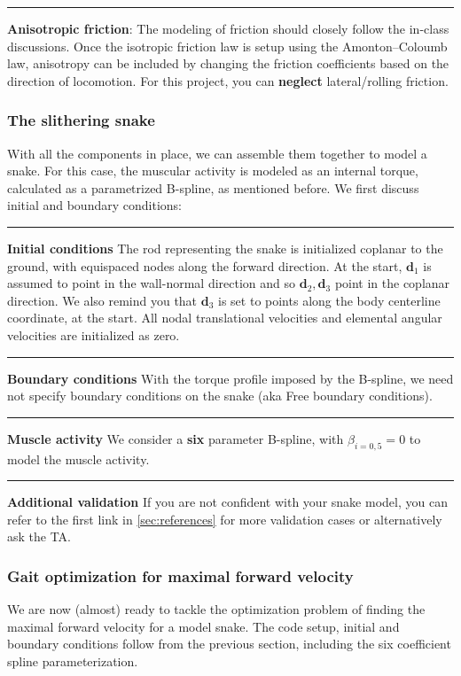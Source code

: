 \documentclass[11pt]{article}
\begin{document}
\noindent\rule{1\textwidth}{0.01pt}
\textbf{Anisotropic friction}: The modeling of friction should closely follow
the in-class discussions. Once the isotropic friction law is setup using
the Amonton--Coloumb law, anisotropy can be included by changing the
friction coefficients based on the direction of locomotion.
For this project, you can \textbf{neglect} lateral/rolling friction.

\subsubsection{The slithering snake}
\label{sec:org1e23fa4}
With all the components in place, we can assemble them together to model a
snake. For this case, the muscular activity
is modeled as an internal torque, calculated as a parametrized B-spline, as mentioned
before. We first discuss initial and boundary conditions:

\noindent\rule{1\textwidth}{0.01pt}
\textbf{Initial conditions} The rod representing the snake is initialized coplanar
to the ground, with equispaced nodes along the forward direction. At the start, \(\mathbf{d}_1\) is assumed
to point in the wall-normal direction and so \(\mathbf{d}_2, \mathbf{d}_3\) point in the coplanar direction. We also remind you that \(\mathbf{d}_3\) is
set to points along the body centerline coordinate, at the start. All nodal
translational velocities and elemental angular velocities are initialized as zero.

\noindent\rule{1\textwidth}{0.01pt}
\textbf{Boundary conditions} With the torque profile imposed by the B-spline, we
need not specify boundary conditions on the snake (aka Free boundary conditions).

\noindent\rule{1\textwidth}{0.01pt}
\textbf{Muscle activity} We consider a \textbf{six} parameter B-spline,
with \(\beta_{i=0,5}=0\) to model the muscle activity.

\noindent\rule{1\textwidth}{0.01pt}
\textbf{Additional validation} If you are not confident with your snake model, you
can refer to the first link in \cref{sec:references} for more validation cases or alternatively
ask the TA.

\subsubsection{Gait optimization for maximal forward velocity}
\label{sec:org24372a6}
We are now (almost) ready to tackle the optimization problem of finding the
maximal forward velocity for a model snake. The code setup, initial and
boundary conditions follow from the previous section, including the
six coefficient spline parameterization.
\end{document}
